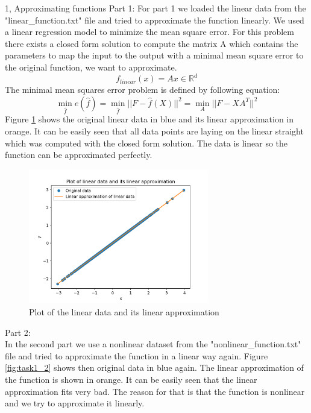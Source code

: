 \documentclass[10pt,a4paper]{article}
\begin{document}
\frontpage

\begin{task}{1, Approximating functions}
Part 1: \bigbreak
For part 1 we loaded the linear data from the "linear\_function.txt" file and tried to approximate the function linearly. We used a linear regression model to minimize the mean square error. For this problem there exists a closed form solution to compute the matrix A which contains the parameters to map the input to the output with a minimal mean square error to the original function, we want to approximate. 
\begin{equation*}
f_{linear}(x) = Ax \in \mathbb{R}^d
\end{equation*}
The minimal mean squares error problem is defined by following equation:
\begin{equation*}
\min_{\hat{f}}e(\hat{f}) = \min_{\hat{f}}||F-\hat{f}(X)||^2 = \min_{A}||F-XA^T||^2
\end{equation*}
Figure \ref{fig:task1_1} shows the original linear data in blue and its linear approximation in orange. It can be easily seen that all data points are laying on the linear straight which was computed with the closed form solution. The data is linear so the function can be approximated perfectly.
\begin{figure}[H]
\centering
\includegraphics[width=0.7\textwidth]{../plots/task1_part1.png}
\caption{Plot of the linear data and its linear approximation}
\label{fig:task1_1}
\end{figure}
Part 2: \\
In the second part we use a nonlinear dataset from the "nonlinear\_function.txt" file and tried to approximate the function in a linear way again.
Figure \ref{fig:task1_2} shows then original data in blue again. The linear approximation of the function is  shown in orange. It can be easily seen that the linear approximation fits very bad. The reason for that is that the function is nonlinear and we try to approximate it linearly.

\end{task}
\end{document}
